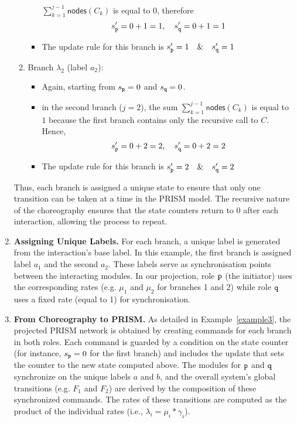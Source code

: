 \begin{example}
\begin{enumerate}
\begin{enumerate}
\begin{itemize}
        $\sum_{k=1}^{j-1} \mathsf{nodes}(C_k)$ is equal to $0$,
        therefore
        \[
          s'_{\mathtt{p}} = 0 + 1 = 1, \quad s'_{\mathtt{q}} = 0 + 1 = 1
        \]
      \item The update rule for this branch is
        $s_{\mathtt{p}}' = 1 \quad \& \quad s_{\mathtt{q}}' = 1$
      \end{itemize}
    \item Branch \(\lambda_2\) (label \(a_2\)):
      \begin{itemize}
      \item Again, starting from \( s_{\mathtt{p}} = 0 \) and
        \( s_{\mathtt{q}} = 0 \).
      \item in the second branch ($j=2$), the sum
        $\sum_{k=1}^{j-1} \mathsf{nodes}(C_k)$ is equal to $1$ because
        the first branch contains only the recursive call to
        $C$. Hence,
        \[
          s'_{\mathtt{p}} = 0 + 2 = 2, \quad s'_{\mathtt{q}} = 0 + 2 = 2
        \]
      \item The update rule for this branch is
        $s_{\mathtt{p}}' = 2\quad\& \quad s_{\mathtt{q}}' = 2$
      \end{itemize}
    \end{enumerate}
    Thus, each branch is assigned a unique state to ensure that only
    one transition can be taken at a time in the PRISM model. The
    recursive nature of the choreography ensures that the state
    counters return to 0 after each interaction, allowing the process
    to repeat.

  \item \textbf{Assigning Unique Labels.}  For each branch, a unique
    label is generated from the interaction’s base label. In this
    example, the first branch is assigned label \(a_1\) and the second
    \(a_2\). These labels serve as synchronisation points between the
    interacting modules. In our projection, role \(\mathtt{p}\) (the
    initiator) uses the corresponding rates (e.g. \(\mu_1\) and
    \(\mu_2\) for branches 1 and 2) while role \(\mathtt{q}\) uses a
    fixed rate (equal to 1) for synchronisation.

  \item \textbf{From Choreography to PRISM.} As detailed in
    Example \ref{example3}, the projected PRISM network is obtained by
    creating commands for each branch in both roles. Each command is
    guarded by a condition on the state counter (for instance,
    \(s_{\mathtt{p}}=0\) for the first branch) and includes the update
    that sets the counter to the new state computed above. The modules
    for \(\mathtt{p}\) and \(\mathtt{q}\) synchronize on the unique labels
    \(a\) and \(b\), and the overall system’s global transitions
    (e.g. \(F_1\) and \(F_2\)) are derived by the composition of these
    synchronized commands. The rates of these transitions are computed
    as the product of the individual rates (i.e.,
    \(\lambda_i = \mu_i * \gamma_i\)).
  \end{enumerate}

\end{example}


